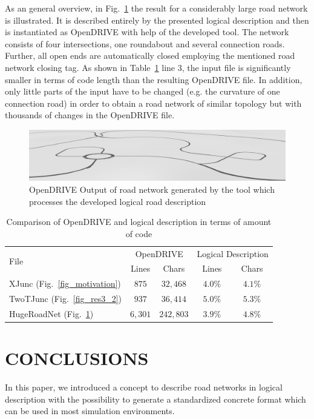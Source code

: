 \documentclass[a4paper, 10pt, conference]{ieeeconf}      %
\begin{document}
As an general overview, in Fig.~\ref{fig_resHuge} the result for a considerably large road network is illustrated. It  is described entirely by the presented logical description and then is instantiated as OpenDRIVE with help of the developed tool. The network consists of four intersections, one roundabout and several connection roads. Further, all open ends are automatically closed employing the mentioned road network closing tag. As shown in Table~\ref{tab_comparison} line 3, the input file is significantly smaller in terms of code length than the resulting OpenDRIVE file. In addition, only little parts of the input have to be changed (e.g. the curvature of one connection road) in order to obtain a road network of similar topology but with thousands of changes in the OpenDRIVE file.
\begin{figure}[ht]
	\includegraphics[width=\textwidth]{fig/res_huge.PNG}
	\caption{OpenDRIVE Output of road network generated by the tool which processes the developed logical road description}
	\label{fig_resHuge}
\end{figure}

\begin{table}[hbt]
\caption{Comparison of OpenDRIVE and logical description in terms of amount of code}
\label{tab_comparison}
\def\arraystretch{1.5}
\begin{center}
\begin{tabular}{l|cccc}
\multirow{2}{*}{File} & \multicolumn{2}{c}{OpenDRIVE} & \multicolumn{2}{c}{Logical Description}\\
& Lines & Chars & Lines & Chars \\
\hline
XJunc (Fig.~\ref{fig_motivation}) & $875$ & $32,468$& $4.0\%$ &$4.1\%$\\
TwoTJunc (Fig.~\ref{fig_res3_2}) & $937$ & $36,414$& $5.0\%$ &$5.3\%$\\
HugeRoadNet (Fig.~\ref{fig_resHuge}) & $6,301$ & $242,803$& $3.9\%$ &$4.8\%$
\end{tabular}
\end{center}
\end{table}

\section{CONCLUSIONS} %
In this paper, we introduced a concept to describe road networks in logical description with the possibility to generate a standardized concrete format which can be used in most simulation environments.
\end{document}
